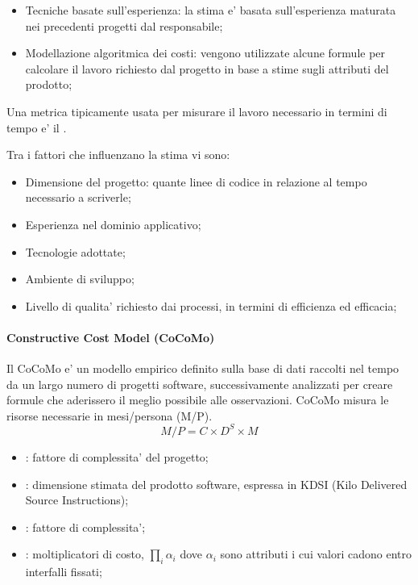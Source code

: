 \begin{itemize}
	\item Tecniche basate sull'esperienza: la stima e' basata sull'esperienza maturata nei precedenti progetti dal responsabile;
	\item Modellazione algoritmica dei costi: vengono utilizzate alcune formule per calcolare il lavoro richiesto dal progetto in base a stime sugli attributi del prodotto;
\end{itemize}

Una metrica tipicamente usata per misurare il lavoro necessario in termini di tempo e' il .

Tra i fattori che influenzano la stima vi sono:
\begin{itemize}
        \item Dimensione del progetto: quante linee di codice in relazione al tempo necessario a scriverle;
        \item Esperienza nel dominio applicativo;
        \item Tecnologie adottate;
        \item Ambiente di sviluppo;
        \item Livello di qualita' richiesto dai processi, in termini di efficienza ed efficacia;
\end{itemize}

\paragraph{Constructive Cost Model (CoCoMo)}
Il CoCoMo e' un modello empirico definito sulla base di dati raccolti nel tempo da un largo numero di progetti software, successivamente analizzati per creare formule che aderissero il meglio possibile alle osservazioni. CoCoMo misura le risorse necessarie in mesi/persona (M/P).
\[
        M/P = C \times D^S \times M
\]
\begin{itemize}
	\item {}: fattore di complessita' del progetto;
	\item {}: dimensione stimata del prodotto software, espressa in KDSI (Kilo Delivered Source Instructions);
	\item {}: fattore di complessita';
	\item {}: moltiplicatori di costo, $\prod_i \alpha_i$ dove $\alpha_i$ sono attributi i cui valori cadono entro interfalli fissati;
\end{itemize}


